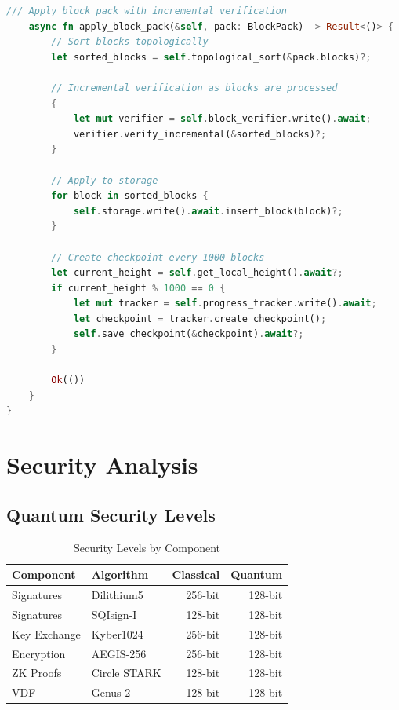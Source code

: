 \documentclass[11pt,a4paper]{article}
\begin{document}
\begin{lstlisting}[language=Rust, caption=TurboSync Crypto Integration]
    /// Apply block pack with incremental verification
    async fn apply_block_pack(&self, pack: BlockPack) -> Result<()> {
        // Sort blocks topologically
        let sorted_blocks = self.topological_sort(&pack.blocks)?;

        // Incremental verification as blocks are processed
        {
            let mut verifier = self.block_verifier.write().await;
            verifier.verify_incremental(&sorted_blocks)?;
        }

        // Apply to storage
        for block in sorted_blocks {
            self.storage.write().await.insert_block(block)?;
        }

        // Create checkpoint every 1000 blocks
        let current_height = self.get_local_height().await?;
        if current_height % 1000 == 0 {
            let mut tracker = self.progress_tracker.write().await;
            let checkpoint = tracker.create_checkpoint();
            self.save_checkpoint(&checkpoint).await?;
        }

        Ok(())
    }
}
\end{lstlisting}

\section{Security Analysis}

\subsection{Quantum Security Levels}

\begin{table}[h]
\centering
\begin{tabular}{llrr}
\toprule
\textbf{Component} & \textbf{Algorithm} & \textbf{Classical} & \textbf{Quantum} \\
\midrule
Signatures & Dilithium5 & 256-bit & 128-bit \\
Signatures & SQIsign-I & 128-bit & 128-bit \\
Key Exchange & Kyber1024 & 256-bit & 128-bit \\
Encryption & AEGIS-256 & 256-bit & 128-bit \\
ZK Proofs & Circle STARK & 128-bit & 128-bit \\
VDF & Genus-2 & 128-bit & 128-bit \\
\bottomrule
\end{tabular}
\caption{Security Levels by Component}
\end{table}
\end{document}
